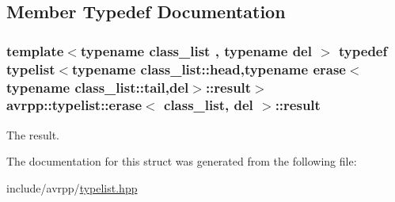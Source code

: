 \subsection{Member Typedef Documentation}
\hypertarget{structavrpp_1_1typelist_1_1erase_a5804c06bd9170bca96b41ef646e73852}{
\subsubsection[{result}]{\setlength{\rightskip}{0pt plus 5cm}template$<$typename class\_\-list , typename del $>$ typedef {\bf typelist}$<$typename class\_\-list::head,typename {\bf erase}$<$typename class\_\-list::tail,del$>$::{\bf result}$>$ {\bf avrpp::typelist::erase}$<$ class\_\-list, del $>$::{\bf result}}}
\label{structavrpp_1_1typelist_1_1erase_a5804c06bd9170bca96b41ef646e73852}


The result. 



The documentation for this struct was generated from the following file:\begin{DoxyCompactItemize}
\item 
include/avrpp/\hyperlink{typelist_8hpp}{typelist.hpp}\end{DoxyCompactItemize}
